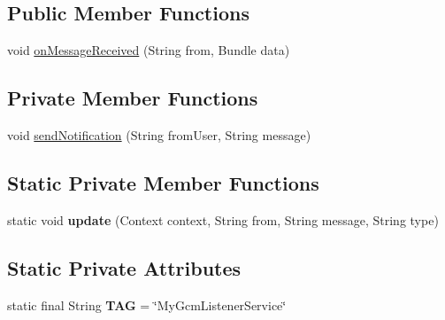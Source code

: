 \subsection*{Public Member Functions}
\begin{DoxyCompactItemize}
\item 
void \hyperlink{classcom_1_1example_1_1sebastian_1_1tindertp_1_1services_1_1MyGcmListenerService_ad65050d5130f62f8aa062f21fe49f35a}{on\+Message\+Received} (String from, Bundle data)
\end{DoxyCompactItemize}
\subsection*{Private Member Functions}
\begin{DoxyCompactItemize}
\item 
void \hyperlink{classcom_1_1example_1_1sebastian_1_1tindertp_1_1services_1_1MyGcmListenerService_ae7a722e3ab78f165da8183b952188fa0}{send\+Notification} (String from\+User, String message)
\end{DoxyCompactItemize}
\subsection*{Static Private Member Functions}
\begin{DoxyCompactItemize}
\item 
static void {\bfseries update} (Context context, String from, String message, String type)\hypertarget{classcom_1_1example_1_1sebastian_1_1tindertp_1_1services_1_1MyGcmListenerService_a7a0f68b8970db0fe0d8e2a895eac4389}{}\label{classcom_1_1example_1_1sebastian_1_1tindertp_1_1services_1_1MyGcmListenerService_a7a0f68b8970db0fe0d8e2a895eac4389}

\end{DoxyCompactItemize}
\subsection*{Static Private Attributes}
\begin{DoxyCompactItemize}
\item 
static final String {\bfseries T\+AG} = \char`\"{}My\+Gcm\+Listener\+Service\char`\"{}\hypertarget{classcom_1_1example_1_1sebastian_1_1tindertp_1_1services_1_1MyGcmListenerService_ad0b98b2dc4aaa5c9faf63cba7f154370}{}\label{classcom_1_1example_1_1sebastian_1_1tindertp_1_1services_1_1MyGcmListenerService_ad0b98b2dc4aaa5c9faf63cba7f154370}

\end{DoxyCompactItemize}


